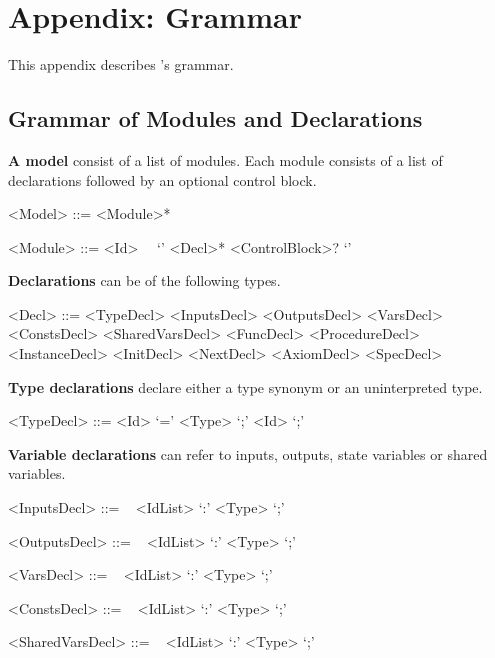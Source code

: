 \chapter{Appendix: \uclid{} Grammar}

\newcommand{\paratitle}[1]{\textsf{\textbf{#1}}}
\newcommand{\nonterminal}[1]{$\langle \textit{#1} \rangle$}

\setlength{\grammarindent}{12em} %

This appendix describes \uclid{}'s grammar.

\section{Grammar of Modules and Declarations}
\paratitle{A model} consist of a list of modules. Each module consists of a list of declarations followed by an optional control block.
\begin{grammar}
     <Model> ::= <Module>*

     <Module> ::=  <Id>~~ `{' <Decl>* <ControlBlock>? `}'
\end{grammar}

\paratitle{Declarations} can be of the following types.
\begin{grammar}
     <Decl> ::= <TypeDecl> 
            \alt <InputsDecl> 
            \alt <OutputsDecl> 
            \alt <VarsDecl> 
            \alt <ConstsDecl> 
            \alt <SharedVarsDecl> 
            \alt <FuncDecl> 
            \alt <ProcedureDecl> 
            \alt <InstanceDecl>
            \alt <InitDecl> 
            \alt <NextDecl> 
            \alt <AxiomDecl>
            \alt <SpecDecl> 
\end{grammar}

\paratitle{Type declarations} declare either a type synonym or an uninterpreted type.
\begin{grammar}
     <TypeDecl> ::=  <Id> `=' <Type> `;'
              \alt {} <Id> `;'

\end{grammar}

\paratitle{Variable declarations} can refer to inputs, outputs, state variables or shared variables.
\begin{grammar}
     <InputsDecl> ::=
        ~ <IdList> `:' <Type> `;'

     <OutputsDecl> ::=
        ~ <IdList> `:' <Type> `;'

     <VarsDecl> ::=
        ~ <IdList> `:' <Type> `;'

     <ConstsDecl> ::=
        ~ <IdList> `:' <Type> `;'

     <SharedVarsDecl> ::=
        ~ <IdList> `:' <Type> `;'

\end{grammar}

